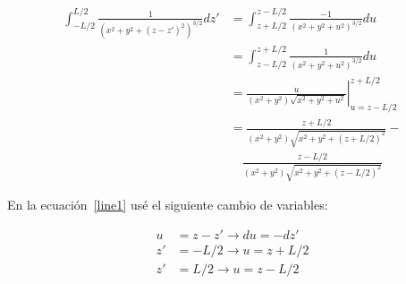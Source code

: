 \documentclass[12pt]{article}
\begin{document}
\begin{align}
    \int_{-L/2}^{L/2}\frac{1}{\left(x^2+y^2+(z-z')^2\right)^{3/2}}dz'&=\int_{z+L/2}^{z-L/2}\frac{-1}{\left(x^2+y^2+u^2\right)^{3/2}}du\label{line1}\\
                                                  &=\int_{z-L/2}^{z+L/2}\frac{1}{\left(x^2+y^2+u^2\right)^{3/2}}du\\
                                                  &=\left.\frac{u}{(x^2+y^2)\sqrt{x^2+y^2+u^2}}\right|_{u=z-L/2}^{z+L/2}\\
                                                  &=\frac{z+L/2}{(x^2+y^2)\sqrt{x^2+y^2+(z+L/2)^2}}-\nonumber\\
                                                  &\quad\frac{z-L/2}{(x^2+y^2)\sqrt{x^2+y^2+(z-L/2)^2}}
\end{align}

En la ecuación~\ref{line1} usé el siguiente cambio de variables:

\begin{align*}
    u&=z-z'\rightarrow du=-dz'\\
    z'&=-L/2\rightarrow u=z+L/2\\
    z'&=L/2\rightarrow u=z-L/2
\end{align*}
\end{document}
